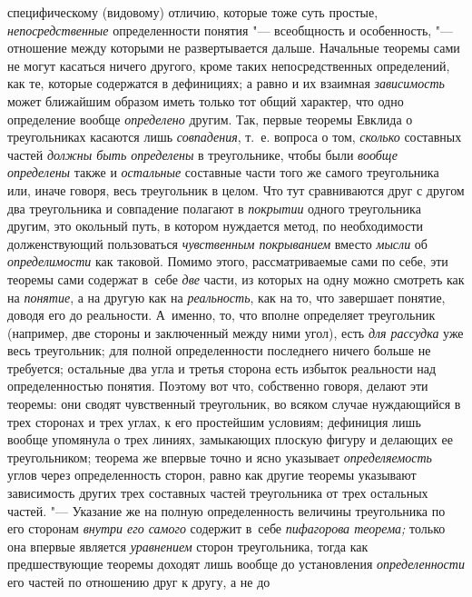 специфическому (видовому) отличию, которые тоже суть простые,
{\em непосредственные}
определенности понятия "--- всеобщность и
особенность, "--- отношение между которыми не развертывается
дальше. Начальные теоремы сами не могут касаться ничего другого, кроме
таких непосредственных определений, как те, которые содержатся в
дефинициях; а равно и их взаимная
{\em зависимость} может
ближайшим образом иметь только тот общий характер, что одно определение
вообще {\em определено}
другим. Так, первые теоремы Евклида о треугольниках касаются
лишь {\em совпадения},
т.~е. вопроса о том,
{\em сколько} составных
частей {\em должны быть определены}
в треугольнике, чтобы были
{\em вообще определены}
также и {\em остальные}
составные части того же самого треугольника или, иначе
говоря, весь треугольник в целом. Что тут сравниваются друг с другом два
треугольника и совпадение полагают в
{\em покрытии} одного
треугольника другим, это окольный путь, в котором нуждается метод, по
необходимости долженствующий пользоваться
{\em чувственным покрыванием}
вместо {\em мысли}
об {\em определимости}
как таковой. Помимо этого, рассматриваемые сами по себе, эти
теоремы сами содержат в~себе {\em две}
части, из которых на одну можно смотреть как на
{\em понятие}, а на
другую как на {\em реальность},
как на то, что завершает понятие, доводя его до реальности.
А~именно, то, что вполне определяет треугольник (например, две стороны и
заключенный между ними угол), есть
{\em для рассудка} уже
весь треугольник; для полной определенности последнего ничего больше не
требуется; остальные два угла и третья сторона есть избыток реальности над
определенностью понятия. Поэтому вот что, собственно говоря,
делают эти теоремы: они сводят чувственный треугольник, во всяком случае
нуждающийся в трех сторонах и трех углах, к его простейшим условиям;
дефиниция лишь вообще упомянула о трех линиях, замыкающих плоскую фигуру и
делающих ее треугольником; теорема же впервые точно и ясно указывает
{\em определяемость}
углов через определенность сторон, равно как другие теоремы
указывают зависимость других трех составных частей треугольника от трех
остальных частей. "--- Указание же на полную определенность
величины треугольника по его сторонам
{\em внутри его самого}
содержит в~себе
{\em пифагорова теорема;}
только она впервые является
{\em уравнением} сторон
треугольника, тогда как предшествующие
теоремы
доходят лишь вообще до установления
{\em определенности} его
частей по отношению друг к другу, а не до
